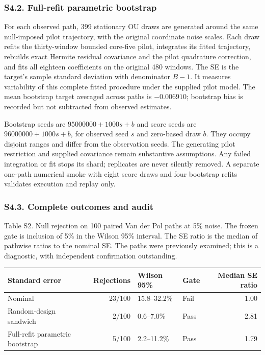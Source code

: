 \documentclass[
  american,
  11pt,
]{article}
\begin{document}
\subsubsection{S4.2. Full-refit parametric
bootstrap}\label{s4.2.-full-refit-parametric-bootstrap}

For each observed path, 399 stationary OU draws are generated around the
same null-imposed pilot trajectory, with the original coordinate noise
scales. Each draw refits the thirty-window bounded core-five pilot,
integrates its fitted trajectory, rebuilds exact Hermite residual
covariance and the pilot quadrature correction, and fits all eighteen
coefficients on the original 480 windows. The SE is the target's sample
standard deviation with denominator \(B-1\). It measures variability of
this complete fitted procedure under the supplied pilot model. The mean
bootstrap target averaged across paths is \(-0.006910\); bootstrap bias
is recorded but not subtracted from observed estimates.

Bootstrap seeds are \(95000000+1000s+b\) and score seeds are
\(96000000+1000s+b\), for observed seed \(s\) and zero-based draw \(b\).
They occupy disjoint ranges and differ from the observation seeds. The
generating pilot restriction and supplied covariance remain substantive
assumptions. Any failed integration or fit stops its shard; replicates
are never silently removed. A separate one-path numerical smoke with
eight score draws and four bootstrap refits validates execution and
replay only.

\subsubsection{S4.3. Complete outcomes and
audit}\label{s4.3.-complete-outcomes-and-audit}

\begin{center}
\begin{minipage}{\linewidth}
Table S2. Null rejection on 100 paired Van der Pol paths at 5\% noise.
The frozen gate is inclusion of 5\% in the Wilson 95\% interval. The SE
ratio is the median of pathwise ratios to the nominal SE. The paths were
previously examined; this is a diagnostic, with independent confirmation
outstanding.

\small\setlength{\tabcolsep}{3pt}
\begin{tabular}{@{}lrllr@{}}
\toprule\noalign{}
Standard error & Rejections & Wilson 95\% & Gate & Median SE ratio \\
\midrule\noalign{}
Nominal & 23/100 & 15.8--32.2\% & Fail & 1.00 \\
Random-design sandwich & 2/100 & 0.6--7.0\% & Pass & 2.81 \\
Full-refit parametric bootstrap & 5/100 & 2.2--11.2\% & Pass & 1.79 \\
\bottomrule
\end{tabular}
\end{minipage}
\end{center}
\end{document}
